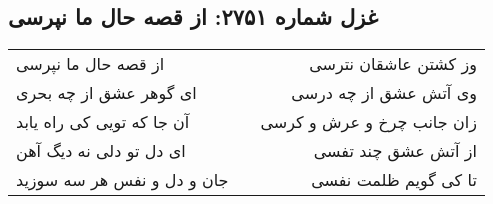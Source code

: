 \begin{center}
\section*{غزل شماره ۲۷۵۱: از قصه حال ما نپرسی}
\label{sec:2751}
\begin{longtable}{l p{0.5cm} r}
از قصه حال ما نپرسی
&&
وز کشتن عاشقان نترسی
\\
ای گوهر عشق از چه بحری
&&
وی آتش عشق از چه درسی
\\
آن جا که تویی کی راه یابد
&&
زان جانب چرخ و عرش و کرسی
\\
ای دل تو دلی نه دیگ آهن
&&
از آتش عشق چند تفسی
\\
جان و دل و نفس هر سه سوزید
&&
تا کی گویم ظلمت نفسی
\\
\end{longtable}
\end{center}

